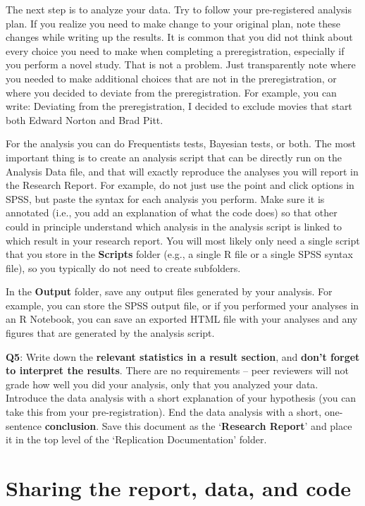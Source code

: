 \documentclass[
  oneside]{book}
\begin{document}
The next step is to analyze your data. Try to follow your pre-registered analysis plan. If you realize you need to make change to your original plan, note these changes while writing up the results. It is common that you did not think about every choice you need to make when completing a preregistration, especially if you perform a novel study. That is not a problem. Just transparently note where you needed to make additional choices that are not in the preregistration, or where you decided to deviate from the preregistration. For example, you can write: Deviating from the preregistration, I decided to exclude movies that start both Edward Norton and Brad Pitt.

For the analysis you can do Frequentists tests, Bayesian tests, or both. The most important thing is to create an analysis script that can be directly run on the Analysis Data file, and that will exactly reproduce the analyses you will report in the Research Report. For example, do not just use the point and click options in SPSS, but paste the syntax for each analysis you perform. Make sure it is annotated (i.e., you add an explanation of what the code does) so that other could in principle understand which analysis in the analysis script is linked to which result in your research report. You will most likely only need a single script that you store in the \textbf{Scripts} folder (e.g., a single R file or a single SPSS syntax file), so you typically do not need to create subfolders.

In the \textbf{Output} folder, save any output files generated by your analysis. For example, you can store the SPSS output file, or if you performed your analyses in an R Notebook, you can save an exported HTML file with your analyses and any figures that are generated by the analysis script.

\textbf{Q5}: Write down the \textbf{relevant statistics in a result section}, and \textbf{don't forget to interpret the results}. There are no requirements -- peer reviewers will not grade how well you did your analysis, only that you analyzed your data. Introduce the data analysis with a short explanation of your hypothesis (you can take this from your pre-registration). End the data analysis with a short, one-sentence \textbf{conclusion}. Save this document as the `\textbf{Research Report}' and place it in the top level of the `Replication Documentation' folder.

\hypertarget{sharing-the-report-data-and-code}{%
\section{Sharing the report, data, and code}\label{sharing-the-report-data-and-code}}
\end{document}

